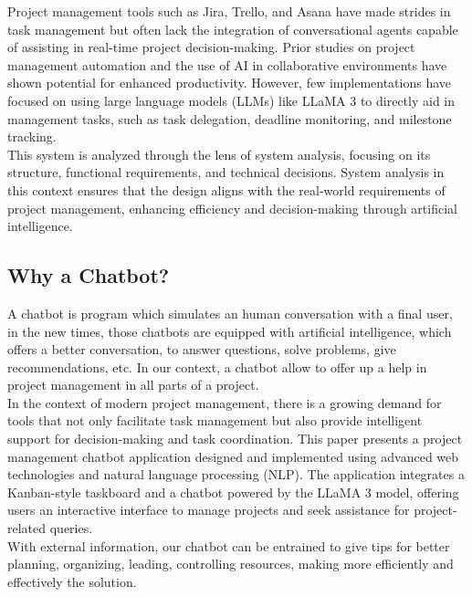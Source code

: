 \documentclass[conference]{IEEEtran}
\begin{document}
	Project management tools such as Jira, Trello, and Asana have made strides in task management but often lack the integration of conversational agents capable of assisting in real-time project decision-making. Prior studies on project management automation and the use of AI in collaborative environments have shown potential for enhanced productivity. However, few implementations have focused on using large language models (LLMs) like LLaMA 3 to directly aid in management tasks, such as task delegation, deadline monitoring, and milestone tracking.\\
	
	
	This system is analyzed through the lens of system analysis, focusing on its structure, functional requirements, and technical decisions. System analysis in this context ensures that the design aligns with the real-world requirements of project management, enhancing efficiency and decision-making through artificial intelligence.\\
	
	
	\subsection{Why a Chatbot?}
	
	A chatbot is program which simulates an human conversation with a final user, in the new times, those chatbots are equipped with artificial intelligence, which offers a better conversation, to answer questions, solve problems, give recommendations, etc. In our context, a chatbot allow to offer up a help in project management in all parts of a project.\\
	
	In the context of modern project management, there is a growing demand for tools that not only facilitate task management but also provide intelligent support for decision-making and task coordination. This paper presents a project management chatbot application designed and implemented using advanced web technologies and natural language processing (NLP). The application integrates a Kanban-style taskboard and a chatbot powered by the LLaMA 3 model, offering users an interactive interface to manage projects and seek assistance for project-related queries.\\
	
	With external information, our chatbot can be entrained to give tips for better planning, organizing, leading, controlling resources, making more efficiently and effectively the solution.\\
	
\end{document}
